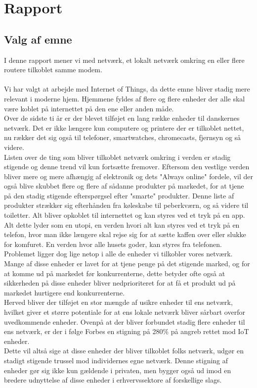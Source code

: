 
\chapter{Rapport}

    \section{Valg af emne}
    I denne rapport mener vi med netværk, et lokalt netværk omkring en eller flere routere tilkoblet samme modem.\\
    \\
    Vi har valgt at arbejde med Internet of Things, da dette emne bliver stadig mere relevant i moderne hjem. Hjemmene fyldes af flere og flere enheder der alle skal være koblet på internettet på den ene eller anden måde.\autocite{website:Statistica2015}\\
    Over de sidste ti år er der blevet tilføjet en lang række enheder til danskernes netværk. Det er ikke længere kun computere og printere der er tilkoblet nettet, nu rækker det sig også til telefoner, smartwatches, chromecasts, fjernsyn og så videre. \\
    Listen over de ting som bliver tilkoblet netværk omkring i verden er stadig stigende og denne trend vil kun fortsætte fremover. Eftersom den vestlige verden bliver mere og mere afhængig af elektronik og dets "Always online" fordele, vil der også blive skubbet flere og flere af sådanne produkter på markedet, for at tjene på den stadig stigende efterspørgsel efter "smarte" produkter. Denne liste af produkter strækker sig efterhånden fra køleskabe til peberkværn, og så videre til toiletter. Alt bliver opkoblet til internettet og kan styres ved et tryk på en app. Alt dette lyder som en utopi, en verden hvori alt kan styres ved et tryk på en telefon, hvor man ikke længere skal rejse sig for at sætte kaffen over eller slukke for komfuret. En verden hvor alle husets goder, kan styres fra telefonen.\\
    Problemet ligger dog lige netop i alle de enheder vi tilkobler vores netværk. Mange af disse enheder er lavet for at tjene penge på det stigende marked, og for at komme ud på markedet før konkurrenterne, dette betyder ofte også at sikkerheden på disse enheder bliver nedprioriteret for at få et produkt ud på markedet hurtigere end konkurrenterne.\\
    Herved bliver der tilføjet en stor mængde af usikre enheder til ens netværk, hvilket giver et større potentiale for at ens lokale netværk bliver sårbart overfor uvedkommende enheder. Ovenpå at der bliver forbundet stadig flere enheder til ens netværk, er der i følge Forbes en stigning på 280\% på angreb rettet mod IoT enheder.\autocite{Forbes2018}\\
    Dette vil altså sige at disse enheder der bliver tilkoblet folks netværk, udgør en stadigt stigende trussel mod individernes egne netværk. Denne stigning af enheder gør sig ikke kun gældende i privaten, men bygger også ud imod en bredere udnyttelse af disse enheder i erhvervssektore af forskellige slags.
    

